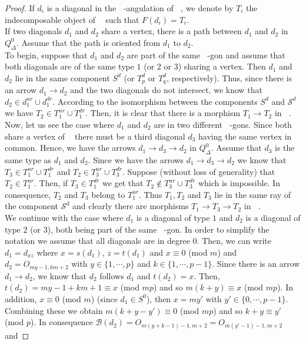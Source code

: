 \documentclass{amsart}
\theoremstyle{plain}
\theoremstyle{definition}
\begin{document}
\begin{proof}
If $d_i$ is a diagonal in the ${\mathop{(m+2)}\nolimits}$-angulation of ${\mathop{P_{p,q,m}}\nolimits}$, we denote by $T_i$ the indecomposable object of ${\mathop{\mathcal{C}_m}\nolimits}$ such that $F(d_i)=T_i$.\\

If two diagonals $d_1$ and $d_2$ share a vertex, there is a path between  $d_1$  and $d_2$ in  $Q_{\Delta}^0$. Assume that the path is oriented from  $d_1$ to $d_2$.\\

To begin, suppose that $d_1$ and $d_2$  are part of the same  ${\mathop{(m+2)}\nolimits}$-gon and assume that both diagonals are of the same   type $1$ (or $2$ or $3$) sharing a vertex. Then $d_1$ and $d_2$ lie in the same component  $S^d$ (or $T^d_p$ or $T^d_q$, respectively).
Thus, since there is an arrow   $d_1\rightarrow d_2$ and the two diagonals do not intersect, we know that  $d_2\in d_1^{ur}\cup d_1^{dr}$. According to the isomorphism between the components $S^d$  and $\mathcal{S}^d$ we have $T_2\in T_1^{ur}\cup T_1^{dr}$. Then, it is clear that there is a  morphism  $T_1\rightarrow T_2$ in  ${\mathop{\mathcal{C}_m}\nolimits}$.\\
Now,  let us see the case where $d_1$ and $d_2$ are in two different ${\mathop{(m+2)}\nolimits}$-gons. Since both share a vertex of ${\mathop{P_{p,q,m}}\nolimits}$ there must be a third diagonal $d_3$ having the same vertex in common. Hence, we have the arrows $d_1\rightarrow d_3 \rightarrow d_2$ in $Q_{\Delta}^0$.
Assume that   $d_3$ is the same type as  $d_1$ and $d_2$.  Since we have the arrows   $d_1\rightarrow d_3 \rightarrow d_2$ we know that
$T_3\in T_1^{ur}\cup T_1^{dr}$ and $T_2\in T_3^{ur}\cup T_3^{dr}$. Suppose   (without loss of generality) that  $T_2\in T_1^{ur}$. Then, if $T_3\in T_1^{dr}$ we get that $T_2\notin T_3^{ur}\cup T_3^{dr}$ which is impossible. In consequence, $T_2$ and $T_3$ belong to  $T_1^{ur}$. Thus $T_1,T_2$ and $T_3$ lie in the same ray of the component  $\mathcal{S}^d$ and clearly there are   morphisms $T_1\rightarrow T_3 \rightarrow T_2$ in  ${\mathop{\mathcal{C}_m}\nolimits}$.\\
We continue with the case where  $d_1$ is a diagonal of  type $1$ and $d_2$ is a diagonal of  type $2$ (or $3$),  both being part of the same  ${\mathop{(m+2)}\nolimits}$-gon.
In order to simplify the notation we assume that all diagonals are in degree  $0$. Then, we can write
$d_1=d_{xz}$ where $x=s(d_1)$, $z=t(d_1)$ and $x\equiv 0$ (mod $m$) and $d_2=O_{my-1,km+2}$ with
$y\in \{1,\cdots, p\}$ and $k\in \{1,\cdots, p-1\}$. Since there is an arrow   $d_1\rightarrow d_2$,
we know that  $d_2$ follows $d_1$   and  $t(d_2)=x$. Then, $t(d_2)=my-1+km+1\equiv x$ (mod $mp$)
 and so  $m(k+y)\equiv x$ (mod $mp$). In addition, $x \equiv  0$ (mod $m$) (since $d_1\in S^0$), then  $x=my'$ with $y'\in \{0,\cdots, p-1\}$.
 Combining these we obtain  $m(k+y-y') \equiv 0$ (mod $mp$) and so $k+y \equiv y'$ (mod $p$). In consequence  $\mathcal{B}(d_2)=O_{m(y+k-1)-1,m+2}=O_{m(y'-1)-1,m+2}$ and


\end{proof}
\end{document}
